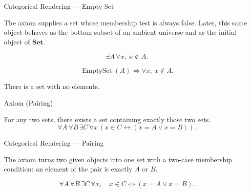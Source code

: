 \begin{lracategoricalcard}{Categorical Rendering --- Empty Set}
\begin{center}

\end{center}
\smallskip
\noindent\footnotesize
The axiom supplies a set whose membership test is always false. Later, this
same object behaves as the bottom subset of an ambient universe and as the
initial object of \(\mathbf{Set}\).
\end{lracategoricalcard}

\begin{remark*}
\[
  \exists A\,\forall x,\ x\notin A.
\]
\end{remark*}

\begin{remark*}
\[
  \operatorname{EmptySet}(A)
  \iff
  \forall x,\ x\notin A.
\]
\end{remark*}

\begin{remark*}[Interpretation]
There is a set with no elements.
\end{remark*}

\NoLocalDependencies

\begin{axiombox}{Axiom (Pairing)}
\begin{axiom}
\label{ax:pairing}
For any two sets, there exists a set containing exactly those two sets.
\[
\forall A \, \forall B \, \exists C \,
\forall x \, (x \in C \leftrightarrow (x = A \lor x = B)).
\]
\end{axiom}
\end{axiombox}

\begin{lracategoricalcard}{Categorical Rendering --- Pairing}
\begin{center}

\end{center}
\smallskip
\noindent\footnotesize
The axiom turns two given objects into one set with a two-case membership
condition: an element of the pair is exactly \(A\) or \(B\).
\end{lracategoricalcard}

\begin{remark*}
\[
  \forall A\,\forall B\,\exists C\,\forall x,\quad
  x\in C \iff (x=A\vee x=B).
\]
\end{remark*}

